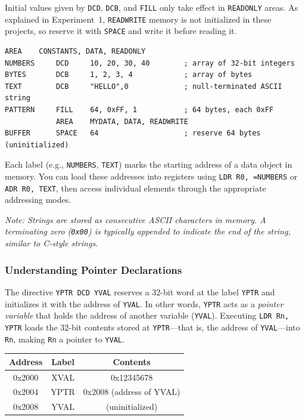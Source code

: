 \noindent Initial values given by \texttt{DCD}, \texttt{DCB}, and \texttt{FILL} only take effect in \texttt{READONLY} areas. As explained in Experiment~1, \texttt{READWRITE} memory is not initialized in these projects, so reserve it with \texttt{SPACE} and write it before reading it.

\begin{lstlisting}[caption={Declaring arrays and strings in memory}]
            AREA    CONSTANTS, DATA, READONLY
NUMBERS     DCD     10, 20, 30, 40        ; array of 32-bit integers
BYTES       DCB     1, 2, 3, 4            ; array of bytes
TEXT        DCB     "HELLO",0             ; null-terminated ASCII string
PATTERN     FILL    64, 0xFF, 1           ; 64 bytes, each 0xFF
            AREA    MYDATA, DATA, READWRITE
BUFFER      SPACE   64                    ; reserve 64 bytes (uninitialized)
\end{lstlisting}

Each label (e.g., \texttt{NUMBERS}, \texttt{TEXT}) marks the starting address of a data object in memory.  
You can load these addresses into registers using \texttt{LDR R0, =NUMBERS} or \texttt{ADR R0, TEXT}, then access individual elements through the appropriate addressing modes.

\noindent\textit{Note: Strings are stored as consecutive ASCII characters in memory. A terminating zero (\texttt{0x00}) is typically appended to indicate the end of the string, similar to C-style strings.}
\subsubsection{Understanding Pointer Declarations}
The directive \texttt{YPTR DCD YVAL} reserves a 32-bit word at the label \texttt{YPTR} and initializes it with the address of \texttt{YVAL}.  
In other words, \texttt{YPTR} acts as a \emph{pointer variable} that holds the address of another variable (\texttt{YVAL}).  
Executing \texttt{LDR Rn, YPTR} loads the 32-bit contents stored at \texttt{YPTR}—that is, the address of \texttt{YVAL}—into \texttt{Rn}, making \texttt{Rn} a pointer to \texttt{YVAL}.


\begin{center}
\begin{tabular}{|c|c|c|}
\hline
\textbf{Address} & \textbf{Label} & \textbf{Contents} \\
\hline
0x2000 & XVAL & 0x12345678 \\
0x2004 & YPTR & 0x2008 (address of YVAL) \\
0x2008 & YVAL & (uninitialized) \\
\hline
\end{tabular}
\end{center}


